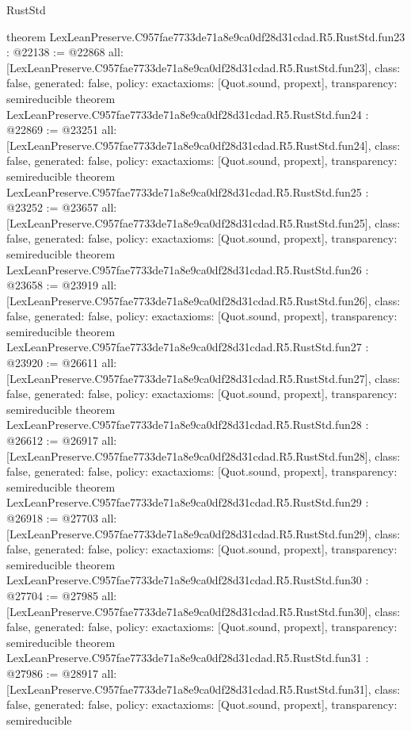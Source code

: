 \begin{lexlean}{RustStd}
\begin{coremodule}
{}
theorem LexLeanPreserve.C957fae7733de71a8e9ca0df28d31cdad.R5.RustStd.fun23 : @22138 := @22868 {
  all: [LexLeanPreserve.C957fae7733de71a8e9ca0df28d31cdad.R5.RustStd.fun23],
  class: false,
  generated: false,
  policy: exact{axioms: [Quot.sound, propext]},
  transparency: semireducible
}
theorem LexLeanPreserve.C957fae7733de71a8e9ca0df28d31cdad.R5.RustStd.fun24 : @22869 := @23251 {
  all: [LexLeanPreserve.C957fae7733de71a8e9ca0df28d31cdad.R5.RustStd.fun24],
  class: false,
  generated: false,
  policy: exact{axioms: [Quot.sound, propext]},
  transparency: semireducible
}
theorem LexLeanPreserve.C957fae7733de71a8e9ca0df28d31cdad.R5.RustStd.fun25 : @23252 := @23657 {
  all: [LexLeanPreserve.C957fae7733de71a8e9ca0df28d31cdad.R5.RustStd.fun25],
  class: false,
  generated: false,
  policy: exact{axioms: [Quot.sound, propext]},
  transparency: semireducible
}
theorem LexLeanPreserve.C957fae7733de71a8e9ca0df28d31cdad.R5.RustStd.fun26 : @23658 := @23919 {
  all: [LexLeanPreserve.C957fae7733de71a8e9ca0df28d31cdad.R5.RustStd.fun26],
  class: false,
  generated: false,
  policy: exact{axioms: [Quot.sound, propext]},
  transparency: semireducible
}
theorem LexLeanPreserve.C957fae7733de71a8e9ca0df28d31cdad.R5.RustStd.fun27 : @23920 := @26611 {
  all: [LexLeanPreserve.C957fae7733de71a8e9ca0df28d31cdad.R5.RustStd.fun27],
  class: false,
  generated: false,
  policy: exact{axioms: [Quot.sound, propext]},
  transparency: semireducible
}
theorem LexLeanPreserve.C957fae7733de71a8e9ca0df28d31cdad.R5.RustStd.fun28 : @26612 := @26917 {
  all: [LexLeanPreserve.C957fae7733de71a8e9ca0df28d31cdad.R5.RustStd.fun28],
  class: false,
  generated: false,
  policy: exact{axioms: [Quot.sound, propext]},
  transparency: semireducible
}
theorem LexLeanPreserve.C957fae7733de71a8e9ca0df28d31cdad.R5.RustStd.fun29 : @26918 := @27703 {
  all: [LexLeanPreserve.C957fae7733de71a8e9ca0df28d31cdad.R5.RustStd.fun29],
  class: false,
  generated: false,
  policy: exact{axioms: [Quot.sound, propext]},
  transparency: semireducible
}
theorem LexLeanPreserve.C957fae7733de71a8e9ca0df28d31cdad.R5.RustStd.fun30 : @27704 := @27985 {
  all: [LexLeanPreserve.C957fae7733de71a8e9ca0df28d31cdad.R5.RustStd.fun30],
  class: false,
  generated: false,
  policy: exact{axioms: [Quot.sound, propext]},
  transparency: semireducible
}
theorem LexLeanPreserve.C957fae7733de71a8e9ca0df28d31cdad.R5.RustStd.fun31 : @27986 := @28917 {
  all: [LexLeanPreserve.C957fae7733de71a8e9ca0df28d31cdad.R5.RustStd.fun31],
  class: false,
  generated: false,
  policy: exact{axioms: [Quot.sound, propext]},
  transparency: semireducible
}
\end{coremodule}
\end{lexlean}

